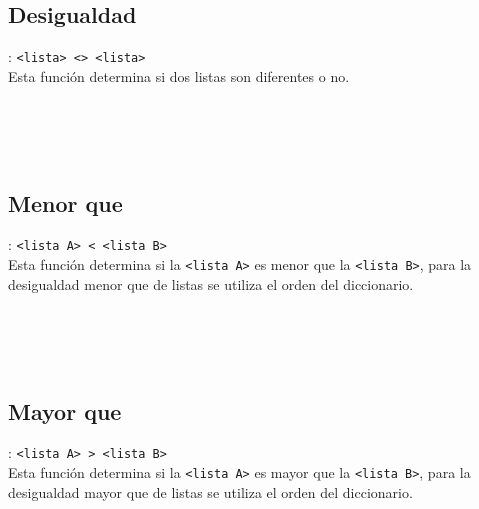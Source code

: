       \subsection*{Desigualdad}: \texttt{<lista>~<>~<lista>}\\
      Esta función determina si dos listas son diferentes o no.
      
      \begin{fxcode}
         \arrowcode{[1, 2] <>~[]}\\
         \\
         \\
      \end{fxcode}
      
      \subsection*{Menor que}: \texttt{<lista A>~\texttt{<}~<lista B>}\\
      Esta función determina si la \texttt{<lista A>} es menor que la \texttt{<lista B>}, para la desigualdad menor que de listas se utiliza el orden del diccionario.
      
      \begin{fxcode}
         \arrowcode{[1, 2] <~[3, 4]}\\
         \\
         \arrowcode{[1, 2, 1] <~[1, 1, 2]}\\
      \end{fxcode}
      
      \subsection*{Mayor que}: \texttt{<lista A>~\texttt{>}~<lista B>}\\
      Esta función determina si la \texttt{<lista A>} es mayor que la \texttt{<lista B>}, para la desigualdad mayor que de listas se utiliza el orden del diccionario.
      
      \begin{fxcode}
         \arrowcode{[1, 2] >~[3, 4]}\\
         \\
         \arrowcode{[1, 2, 1] >~[1, 1, 2]}\\
      \end{fxcode}
      
